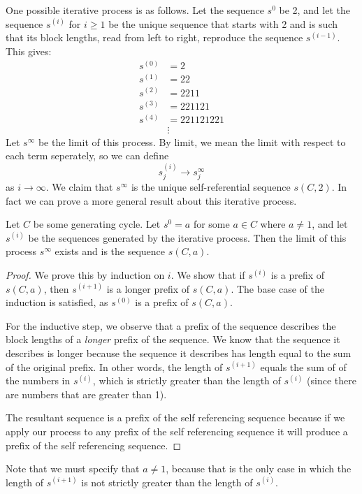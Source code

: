 \documentclass[runningheads,a4paper]{llncs}
\begin{document}
One possible iterative process is as follows. Let the sequence $s^0$ be 2, and let the sequence $s^{(i)}$ for $i \geq 1$ be the unique sequence that starts with 2 and is such that its block lengths, read from left to right, reproduce the sequence $s^{(i-1)}$. This gives:
\begin{align*}
s^{(0)}&= 2\\
s^{(1)} &= 22\\
s^{(2)} &= 2211\\
s^{(3)}&= 221121\\
s^{(4)} &= 221121221\\
&\vdots
\end{align*}
Let $s^\infty$ be the limit of this process. 
By limit, we mean the limit with respect to each term seperately, so we can define
\[ s^{(i)}_j \rightarrow s^\infty_j \]
as $i \rightarrow \infty$. We claim that $s^\infty$ is the unique self-referential sequence $s(C,2)$. In fact we can prove a more general result about this iterative process.

\begin{theorem}
Let $C$ be some generating cycle. Let $s^0 = a$ for some $a \in C$ where $a \neq 1$, and let $s^{(i)}$ be the sequences generated by the iterative process. Then the limit of this process $s^\infty$ exists and is the sequence $s(C,a)$.
\end{theorem}

\begin{proof}
We prove this by induction on $i$. We show that if $s^{(i)}$ is a prefix of $s(C,a)$, then $s^{(i+1)}$ is a longer prefix of $s(C,a)$. The base case of the induction is satisfied, as $s^{(0)}$ is a prefix of $s(C,a)$.

For the inductive step, we observe that a prefix of the sequence describes the block lengths of a \emph{longer} prefix of the sequence. We know that the sequence it describes is longer because the sequence it describes has length equal to the sum of the original prefix. In other words, the length of $s^{(i+1)}$ equals the sum of of the numbers in $s^{(i)}$, which is strictly greater than the length of $s^{(i)}$ (since there are numbers that are greater than 1). 

The resultant sequence is a prefix of the self referencing sequence because if we apply our process to any prefix of the self referencing sequence it will produce a prefix of the self referencing sequence.  
\end{proof}

Note that we must specify that $a \neq 1$, because that is the only case in which the length of $s^{(i+1)}$ is not strictly greater than the length of $s^{(i)}$. 
\end{document}
